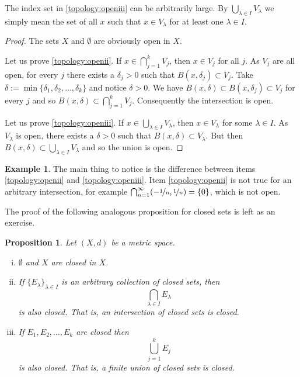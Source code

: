 \documentclass[12pt]{book}
\theoremstyle{plain}
\newtheorem{prop}[thm]{Proposition}
\theoremstyle{remark}
\theoremstyle{definition}
\theoremstyle{exercise}
\theoremstyle{example}
\newtheorem{example}[thm]{Example}
\begin{document}
The index set in \ref{topology:openiii} can be arbitrarily large.
By $\bigcup_{\lambda \in I} V_\lambda$ we simply mean the set of
all $x$ such that $x \in V_\lambda$ for at least one $\lambda \in I$.

\begin{proof}
The sets $X$ and $\emptyset$ are obviously open in $X$.

Let us prove \ref{topology:openii}.
If $x \in \bigcap_{j=1}^k V_j$, then $x \in V_j$ for all $j$.
As $V_j$ are all open, for every $j$ there exists a $\delta_j > 0$ 
such that $B(x,\delta_j) \subset V_j$.  Take $\delta := \min \{
\delta_1,\delta_2,\ldots,\delta_k \}$ and notice $\delta > 0$.  We have
$B(x,\delta) \subset B(x,\delta_j) \subset V_j$ for every $j$ and so
$B(x,\delta) \subset \bigcap_{j=1}^k V_j$.  Consequently the intersection is open.

Let us prove \ref{topology:openiii}.
If $x \in \bigcup_{\lambda \in I} V_\lambda$, then $x \in V_\lambda$ for some
$\lambda \in I$.
As $V_\lambda$ is open, there exists a $\delta > 0$
such that $B(x,\delta) \subset V_\lambda$.  But then
$B(x,\delta) \subset \bigcup_{\lambda \in I} V_\lambda$
and so the union is open.
\end{proof}

\begin{example}
The main thing to notice is the difference between
items
\ref{topology:openii} and \ref{topology:openiii}.
Item \ref{topology:openii} is not true for an arbitrary intersection,
for example $\bigcap_{n=1}^\infty (-\nicefrac{1}{n},\nicefrac{1}{n}) = \{ 0
\}$, which is not open.
\end{example}


The proof of the following analogous proposition for closed sets
is left as an exercise.

\begin{prop} \label{prop:topology:closed}
Let $(X,d)$ be a metric space.
\begin{enumerate}[(i)]
\item \label{topology:closedi} $\emptyset$ and $X$ are closed in $X$.
\item \label{topology:closedii} If $\{ E_\lambda \}_{\lambda \in I}$ is
an arbitrary collection of closed sets, then
\begin{equation*}
\bigcap_{\lambda \in I} E_\lambda
\end{equation*}
is also closed.  That is, an intersection of closed sets is closed.
\item \label{topology:closediii} If $E_1, E_2, \ldots, E_k$ are closed then
\begin{equation*}
\bigcup_{j=1}^k E_j
\end{equation*}
is also closed.  That is, a finite union of closed sets is closed.
\end{enumerate}
\end{prop}
\end{document}
